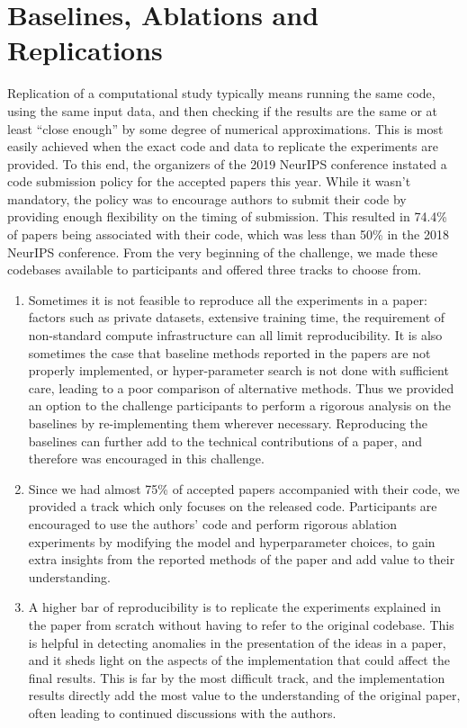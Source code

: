 \section{Baselines, Ablations and Replications}

Replication of a computational study typically means running the same code, using the same input data, and then checking if the results are the same or at least “close enough” by some degree of numerical approximations. This is most easily achieved when the exact code and data to replicate the experiments are provided. To this end, the organizers of the 2019 NeurIPS conference instated a code submission policy for the accepted papers this year. While it wasn’t mandatory, the policy was to encourage authors to submit their code by providing enough flexibility on the timing of submission. This resulted in 74.4\% of papers being associated with their code, which was less than 50\% in the 2018 NeurIPS conference. From the very beginning of the challenge, we made these codebases available to participants and offered three tracks to choose from. 

\begin{enumerate}
    \item {} Sometimes it is not feasible to reproduce all the experiments in a paper: factors such as private datasets, extensive training time, the requirement of non-standard compute infrastructure can all limit reproducibility. It is also sometimes the case that baseline methods reported in the papers are not properly implemented, or hyper-parameter search is not done with sufficient care, leading to a poor comparison of alternative methods. Thus we provided an option to the challenge participants to perform a rigorous analysis on the baselines by re-implementing them wherever necessary. Reproducing the baselines can further add to the technical contributions of a paper, and therefore was encouraged in this challenge.
    
    \item {} Since we had almost 75\% of accepted papers accompanied with their code, we provided a track which only focuses on the released code. Participants are encouraged to use the authors’ code and perform rigorous ablation experiments by modifying the model and hyperparameter choices, to gain extra insights from the reported methods of the paper and add value to their understanding. 
    
    \item {} A higher bar of reproducibility is to replicate the experiments explained in the paper from scratch without having to refer to the original codebase. This is helpful in detecting anomalies in the presentation of the ideas in a paper, and it sheds light on the aspects of the implementation that could affect the final results. This is far by the most difficult track, and the implementation results directly add the most value to the understanding of the original paper, often leading to continued discussions with the authors. 
    
\end{enumerate}



